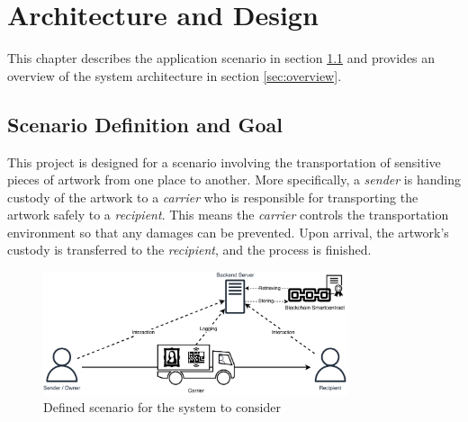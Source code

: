 \chapter{Architecture and Design}
\label{chap:architecture_design}
This chapter describes the application scenario in section \ref{sec:scenario_definition} and provides an overview of the system architecture in section \ref{sec:overview}.

\section{Scenario Definition and Goal}
\label{sec:scenario_definition}
This project is designed for a scenario involving the transportation of sensitive pieces of artwork from one place to another. More specifically, a \textit{sender} is handing custody of the artwork to a \textit{carrier} who is responsible for transporting the artwork safely to a \textit{recipient}. This means the \textit{carrier} controls the transportation environment so that any damages can be prevented. Upon arrival, the artwork's custody is transferred to the \textit{recipient}, and the process is finished.

\begin{figure}[ht]
    \label{fig:scenario}
    \centering
    \includegraphics[width=0.8\textwidth]{diagrams/scenario.drawio.pdf}
    \caption{Defined scenario for the system to consider}
\end{figure}

